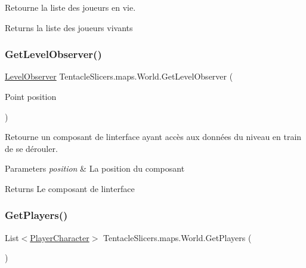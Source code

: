 Retourne la liste des joueurs en vie. 

\begin{DoxyReturn}{Returns}
la liste des joueurs vivants 
\end{DoxyReturn}
\mbox{\label{class_tentacle_slicers_1_1maps_1_1_world_af2e84a1b1b30adaa42efe2dc064d6135}} 
\subsubsection{\texorpdfstring{Get\+Level\+Observer()}{GetLevelObserver()}}
{\footnotesize\ttfamily \hyperlink{class_tentacle_slicers_1_1hud_1_1_level_observer}{Level\+Observer} Tentacle\+Slicers.\+maps.\+World.\+Get\+Level\+Observer (\begin{DoxyParamCaption}\item[{Point}]{position }\end{DoxyParamCaption})}



Retourne un composant de l\textquotesingle{}interface ayant accès aux données du niveau en train de se dérouler. 


\begin{DoxyParams}{Parameters}
{\em position} & La position du composant \\
\hline
\end{DoxyParams}
\begin{DoxyReturn}{Returns}
Le composant de l\textquotesingle{}interface 
\end{DoxyReturn}
\mbox{\label{class_tentacle_slicers_1_1maps_1_1_world_a20a8554db452ea19e6000fe733f83c8f}} 
\subsubsection{\texorpdfstring{Get\+Players()}{GetPlayers()}}
{\footnotesize\ttfamily List$<$\hyperlink{class_tentacle_slicers_1_1actors_1_1_player_character}{Player\+Character}$>$ Tentacle\+Slicers.\+maps.\+World.\+Get\+Players (\begin{DoxyParamCaption}{ }\end{DoxyParamCaption})}



